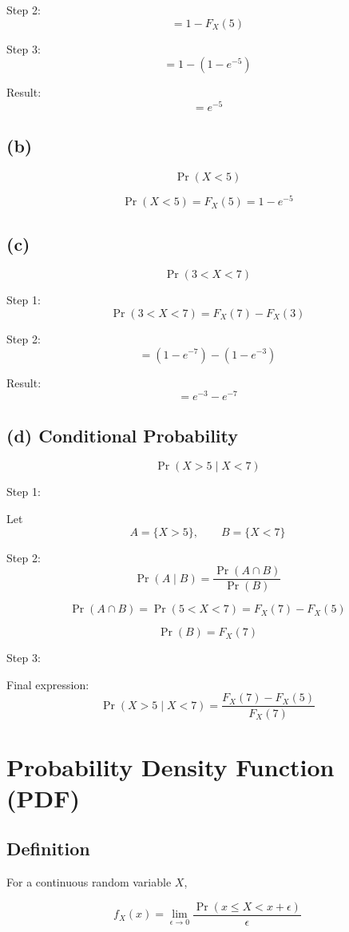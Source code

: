 \documentclass[12pt]{article}
\begin{document}
Step 2:
\[
= 1 - F_X(5)
\]

Step 3:
\[
= 1 - (1 - e^{-5})
\]

Result:
\[
= e^{-5}
\]

\subsection*{(b)}

\[
\Pr(X < 5)
\]

\[
\Pr(X < 5) = F_X(5) = 1 - e^{-5}
\]

\subsection*{(c)}

\[
\Pr(3 < X < 7)
\]

Step 1:
\[
\Pr(3 < X < 7) = F_X(7) - F_X(3)
\]

Step 2:
\[
= (1 - e^{-7}) - (1 - e^{-3})
\]

Result:
\[
= e^{-3} - e^{-7}
\]

\subsection*{(d) Conditional Probability}

\[
\Pr(X > 5 \mid X < 7)
\]

Step 1:

Let
\[
A = \{X > 5\}, \qquad B = \{X < 7\}
\]

Step 2:
\[
\Pr(A \mid B) = \frac{\Pr(A \cap B)}{\Pr(B)}
\]

\[
\Pr(A \cap B) = \Pr(5 < X < 7) = F_X(7) - F_X(5)
\]

\[
\Pr(B) = F_X(7)
\]

Step 3:

Final expression:
\[
\Pr(X > 5 \mid X < 7)
=
\frac{F_X(7) - F_X(5)}{F_X(7)}
\]

\section{Probability Density Function (PDF)}

\subsection{Definition}

For a continuous random variable $X$,

\[
f_X(x) =
\lim_{\epsilon \to 0}
\frac{\Pr(x \le X < x+\epsilon)}{\epsilon}
\]
\end{document}
